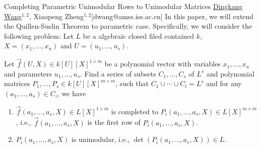 \begin{abstract_online}{Completing Parametric Unimodular Rows to Unimodular Matrices}{%
        \underline{Dingkang Wang}$^{1,2}$, Xiaopeng Zheng$^{1,2}$}{[dwang@amss.iss.ac.cn]
        }
In this paper, we will extend the Quillen-Suslin Theorem to parametric case.  Specifically, we will consider the following problem: Let $L$ be a algebraic closed filed contained $k$, $X = (x_1,\ldots,x_n)$ and $U = (u_1,\ldots,u_s)$.

\begin{problem}
	Let $\vec{f}(U,X)\in k[U][X]^{1 \times m}$ be a polynomial vector with variables $x_1,\ldots,x_n$ and parameters $u_1,\ldots,u_s$. Find a series of subsets $C_1,\ldots,C_s$ of $L^s$ and polynomial matrices $P_1,\ldots,P_s\in k[U][X]^{m \times m}$, such that $C_1 \cup \cdots \cup  C_l= L^s$ and for any $(a_1,\ldots,a_s)\in C_i$, we have
	\vspace{-0.4cm}
	\begin{enumerate}
		\item $\vec{f}(a_1,\ldots,a_s,X)\in L[X]^{1\times m}$ is completed to $P_i(a_1,\ldots,a_s,X)\in L[X]^{m\times m}$, i.e., $\vec{f}(a_1,\ldots,a_s,X)$ is the first row of $P_i(a_1,\ldots,a_s,X)$.
		\item $P_i(a_1,\ldots,a_s,X)$ is unimodular, i.e., $\det(P_i(a_1,\ldots,a_s,X)) \in L$.
	\end{enumerate}
\end{problem}



\end{abstract_online}
